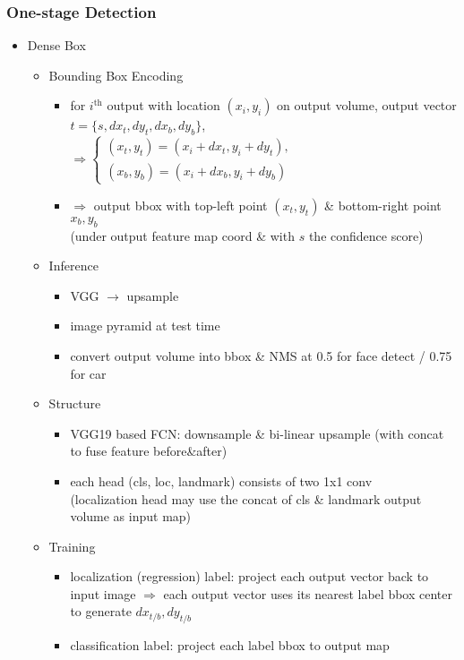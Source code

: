 \subsubsection{One-stage Detection}
\begin{itemize}
\item Dense Box
	\begin{itemize}
	\item Bounding Box Encoding
		\begin{itemize}
		\item for $i^\text{th}$ output with location $(x_i, y_i)$ on output volume, output vector $t = \{s, dx_t, dy_t, dx_b, dy_b\}$, \\
		$\Rightarrow \begin{cases} (x_t, y_t) = (x_i+dx_t, y_i+dy_t), \\ (x_b, y_b) = (x_i+dx_b, y_i+dy_b) \end{cases}$
		\item $\Rightarrow$ output bbox with top-left point $(x_t, y_t)$ \& bottom-right point $x_b, y_b$ \\ 
		(under output feature map coord \& with $s$ the confidence score)
		\end{itemize}
	\item Inference
		\begin{itemize}
		\item VGG $\rightarrow$ upsample 
		\item image pyramid at test time
		\item convert output volume into bbox \& NMS at 0.5 for face detect / 0.75 for car
		\end{itemize}
	\item Structure
		\begin{itemize}
		\item VGG19 based FCN: downsample \& bi-linear upsample (with concat to fuse feature before\&after)
		\item each head (cls, loc, landmark) consists of two 1x1 conv \\
		(localization head may use the concat of cls \& landmark output volume as input map)
		\end{itemize}
	\item Training
		\begin{itemize}
		\item localization (regression) label: project each output vector back to input image
		$\Rightarrow$ each output vector uses its nearest label bbox center to generate $dx_{t/b}, dy_{t/b}$
		\item classification label: project each label bbox to output map \\ 

\end{itemize}
\end{itemize}
\end{itemize}
